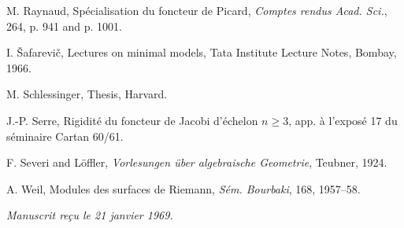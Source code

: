 \documentclass[10pt]{article}
\begin{document}
\begin{description}[leftmargin=2.4em,labelwidth=2.1em,itemsep=0.05em]
\item[{[R]}] M. Raynaud, Spécialisation du foncteur de Picard, \emph{Comptes rendus Acad. Sci.}, 264, p. 941 and p. 1001.
\item[{[Š]}] I. Šafarevič, Lectures on minimal models, Tata Institute Lecture Notes, Bombay, 1966.
\item[{[Sc]}] M. Schlessinger, Thesis, Harvard.
\item[{[S]}] J.-P. Serre, Rigidité du foncteur de Jacobi d'échelon $n\geq3$, app. à l'exposé 17 du séminaire Cartan 60/61.
\item[{[Se]}] F. Severi and Löffler, \emph{Vorlesungen über algebraische Geometrie}, Teubner, 1924.
\item[{[W]}] A. Weil, Modules des surfaces de Riemann, \emph{Sém. Bourbaki}, 168, 1957--58.
\end{description}

\begin{flushright}
\emph{Manuscrit reçu le 21 janvier 1969.}
\end{flushright}
\end{document}
